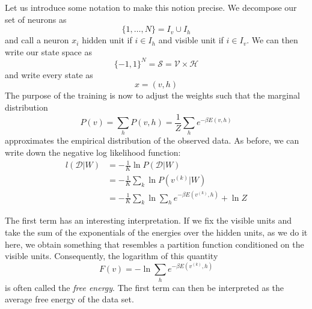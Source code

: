 \documentclass[a4paper, draft]{article}
\theoremstyle{own}
\theoremstyle{remark}
\begin{document}
Let us introduce some notation to make this notion precise. We decompose our set of neurons as
$$
\{ 1, \dots, N \} = I_v \cup I_h
$$
and call a neuron $x_i$ hidden unit if $i \in I_h$ and visible unit if $i \in I_v$. We can then write our state space as
$$
\{ -1, 1\}^N = {\mathcal S} = {\mathcal V} \times \mathcal {H}
$$
and write every state as
$$
x = (v,h)
$$
The purpose of the training is now to adjust the weights such that the marginal distribution
$$
P(v) = \sum_h P(v,h) = \frac{1}{Z} \sum_h e^{-\beta E(v,h)}
$$
approximates the empirical distribution of the observed data. As before, we can write down the negative log likelihood function:
\begin{align*}
l({\mathcal D} | W) &= - \frac{1}{K} \ln P({\mathcal D} | W) \\
&= - \frac{1}{K} \sum_k \ln P(v^{(k)} | W) \\
&= - \frac{1}{K} \sum_k  \ln \sum_h e^{-\beta E(v^{(k)},h)}+  \ln Z
\end{align*}

The first term has an interesting interpretation. If we fix the visible units and take the sum of the exponentials of the energies over the hidden units, as we do it here, we obtain something that resembles a partition function conditioned on the visible units. Consequently, the logarithm of this quantity
$$
F(v) = - \ln \sum_h e^{-\beta E(v^{(k)}, h)}
$$
is often called the {\em free energy}. The first term can then be interpreted as the average free energy of the data set.
\end{document}
